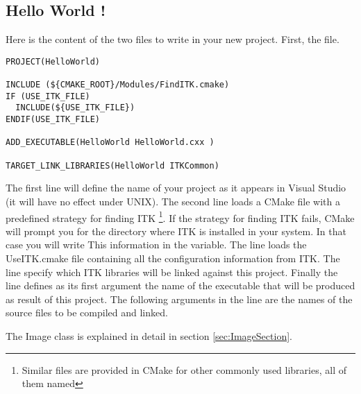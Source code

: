 \subsection{Hello World !}
\label{sec:HelloWorldITK}


Here is the content of the two files to write in your new project. First, the
 file.

\begin{verbatim}
PROJECT(HelloWorld)

INCLUDE (${CMAKE_ROOT}/Modules/FindITK.cmake)
IF (USE_ITK_FILE)
  INCLUDE(${USE_ITK_FILE})
ENDIF(USE_ITK_FILE)

ADD_EXECUTABLE(HelloWorld HelloWorld.cxx )

TARGET_LINK_LIBRARIES(HelloWorld ITKCommon)
\end{verbatim}

The first line will define the name of your project as it appears in Visual
Studio (it will have no effect under UNIX). The second line loads a CMake
file with a predefined strategy for finding ITK \footnote{Similar files are
provided in CMake for other commonly used libraries, all of them named
}. If the strategy for finding ITK fails, CMake will prompt
you for the directory where ITK is installed in your system. In that case you
will write This information in the  variable. The line  loads the UseITK.cmake file containing all the
configuration information from ITK. The  line specify
which ITK libraries will be linked against this project. Finally the line
 defines as its first argument the name of the executable
that will be produced as result of this project. The following arguments in the
line are the names of the source files to be compiled and linked.



The Image class is explained in detail in section \ref{sec:ImageSection}.



